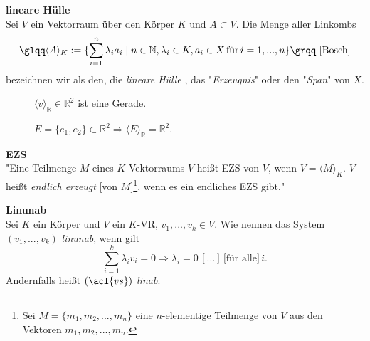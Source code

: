 \theoremstyle{definition}
\begin{definition}{\textbf{lineare Hülle}}
	\\ Sei $V$ ein Vektorraum über den Körper $K$ und $A \subset V$. Die Menge aller \aclp{Linkomb} 
\[\text{\glqq}\langle A \rangle_K := \{\sum \limits_{i=1}^{n} \lambda_i a_i \mid n \in \mathbb{N}, \lambda_i \in K, a_i \in X \,\text{für} \, i = 1,...,n \}\text{\grqq \cite[S. 30]{Bosch}}\]
bezeichnen wir als den,  die {\glqq}\emph{lineare Hülle}{\grqq} \cite[S. 298, 16.4]{Tut}, das "\emph{Erzeugnis}" \cite[S. 298, 16.4]{Tut} oder den "\emph{Span}" \cite[S. 298, 16.4]{Tut} von $X$. 
\label{linhuelledef}
\end{definition}

\begin{figure} [!tbp]
 	\centering
	\begin{minipage}[b]{0.4\textwidth}
		\def\svgwidth{175pt}
		
		\caption{$\langle v \rangle_\mathbb{R} \in \mathbb{R}^2$ ist eine Gerade.} 
		\label{fig:UVR}
	\end{minipage}
\hfill
	\begin{minipage}[b]{0.4\textwidth}
		\def\svgwidth{175pt}
		
		\caption{\(E = \{e_1,e_2\} \subset \mathbb{R}^2 \Rightarrow \langle E \rangle_{\mathbb{R}} = \mathbb{R}^2\).}
	\end{minipage}
\end{figure} 
 
\theoremstyle{definition}
\begin{definition}{\textbf{\acl{EZS}}}
	\\"Eine Teilmenge $M$ eines $K$-Vektorraums $V$ heißt \acl{EZS} von $V$, wenn $V = \langle M \rangle_K$. $V$ heißt \emph{endlich erzeugt} [von $M$]\footnote{\label{foot:1}Sei $M = \{m_1, m_2, ..., m_n\}$ eine $n$-elementige Teilmenge von $V$ aus den Vektoren $m_1, m_2, ..., m_n$.}, wenn es ein endliches \acl{EZS} gibt." \cite[S. 39, 9.4]{Skript}
\end{definition}


\theoremstyle{definition}
\begin{definition}{\textbf{\acl{Linunab}}}
\label{def:linunab}
	\\ \glqq Sei $K$ ein Körper und $V$ ein $K$-\acl{VR}, $v_1, ..., v_k \in V$. Wie nennen das System $(v_1, ..., v_k)$ \emph{\acl{linunab}}, wenn gilt
	\[\sum \limits_{i=1}^{k} \lambda_i v_i = 0 \Longrightarrow \lambda_i = 0 \,[...]\, \text{[für alle]}\, i \text{.}\]
	Andernfalls heißt \((\acl{vs})\) \emph{\acl{linab}}.{\grqq} \cite[S. 298, 16.5]{Tut} 
\end{definition}

